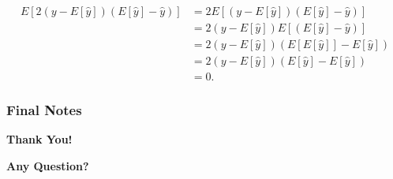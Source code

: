 \documentclass[compress,oilve]{beamer}
\begin{document}
{{$$\begin{split}
E[2(y - E[{\hat{y}}])(E[{\hat{y}}] - \hat{y})]  &= 2 E[(y - E[{\hat{y}}])(E[{\hat{y}}] - \hat{y})] \\
&=  2(y - E[{\hat{y}}])E[(E[{\hat{y}}] - \hat{y})] \\
&= 2(y - E[{\hat{y}}])(E[E[{\hat{y}}]] - E[\hat{y}])\\
&= 2(y - E[{\hat{y}}])(E[{\hat{y}}] - E[{\hat{y}}]) \\
&= 0.
\end{split}$$


}


	
	

	
	
	
}



\frametitle{Final Notes}
\centering
\vspace{50 pt}
\textbf{Thank You!}

\vspace{50pt}
\textbf{Any Question?}
\end{document}

